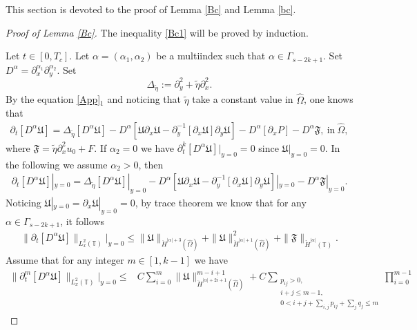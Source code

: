 \documentclass{amsart}
\numberwithin{equation}{section}
\begin{document}
This section is devoted to the  proof of Lemma \ref{Bc} and Lemma \ref{bc}.
\begin{proof}[Proof of Lemma \ref{Bc}]
The inequality \eqref{Bc1} will be proved by induction.

Let $t\in [0,T_{c}]$. Let $\alpha=(\alpha_{1},\alpha_{2})$ be a multiindex such that $\alpha\in\Gamma_{s-2k+1}$.
Set $D^{\alpha}=\partial_{x}^{\alpha_{1}}\partial_{y}^{\alpha_{2}}$.
Set
$$\Delta_{\tilde{\eta}}:=\partial_{y}^{2}+\tilde{\eta}\partial_{x}^{2}.$$
By the equation \eqref{App}$_{1}$ and noticing that $\tilde{\eta}$ take a constant value in $\hat{\Omega}$, one knows that
\begin{align*}
\partial_{t}[D^{\alpha}\mathfrak{U}]
= \Delta_{\tilde{\eta}}[D^{\alpha}\mathfrak{U}]
 -D^{\alpha}[\mathfrak{U}\partial_{x}\mathfrak{U}-\partial_{y}^{-1}[\partial_{x}\mathfrak{U}]\partial_{y}\mathfrak{U}]
 -D^{\alpha}[\partial_{x}P]
 -D^{\alpha}\mathfrak{F},~\text{in}~\hat{\Omega},
\end{align*}
where $\mathfrak{F}=\tilde{\eta}\partial_{x}^{2}u_{0}+F$.
If $\alpha_{2}=0$ we have $\partial_{t}^{k}[D^{\alpha}\mathfrak{U}]|_{y=0}=0$ since $\mathfrak{U}|_{y=0}=0$. In the following we assume $\alpha_{2}>0$, then
\begin{align}\label{Dalphae}
\partial_{t}[D^{\alpha}\mathfrak{U}]|_{y=0}
= \Delta_{\tilde{\eta}}[D^{\alpha}\mathfrak{U}]|_{y=0}
 -D^{\alpha}[\mathfrak{U}\partial_{x}\mathfrak{U}-\partial_{y}^{-1}[\partial_{x}\mathfrak{U}]\partial_{y}\mathfrak{U}]|_{y=0}
 -D^{\alpha}\mathfrak{F}|_{y=0}.
\end{align}
Noticing $\mathfrak{U}|_{y=0}=\partial_{x}\mathfrak{U}|_{y=0}=0$, by trace theorem we know that for any $\alpha\in\Gamma_{s-2k+1}$, it follows
\begin{align*}
\|\partial_{t}[D^{\alpha}\mathfrak{U}]\|_{L_{x}^{2}(\mathbb{T})}|_{y=0}
\leq \|\mathfrak{U}\|_{\ddot{H}^{|\alpha|+3}(\hat{\Omega})}
    +\|\mathfrak{U}\|_{\ddot{H}^{|\alpha|+1}(\hat{\Omega})}^{2}
    +\|\mathfrak{F}\|_{\mathring{H}^{|\alpha|}(\mathbb{T})}.
\end{align*}
Assume that for any integer $m\in [1,k-1]$ we have
\begin{align}\label{indA}
\|\partial_{t}^{m}[D^{\alpha}\mathfrak{U}]\|_{L_{x}^{2}(\mathbb{T})}|_{y=0}
\leq& C\sum_{i=0}^{m}\|\mathfrak{U}\|_{\ddot{H}^{|\alpha|+2i+1}(\hat{\Omega})}^{m-i+1}
     +C\sum_{\substack{p_{ij}>0,\\ i+j\leq m-1,\\0<i+j+\sum\limits_{i,j} p_{ij}+\sum\limits_{j} q_{j}\leq m}}\prod_{i=0}^{m-1}

\end{align}
\end{proof}
\end{document}
